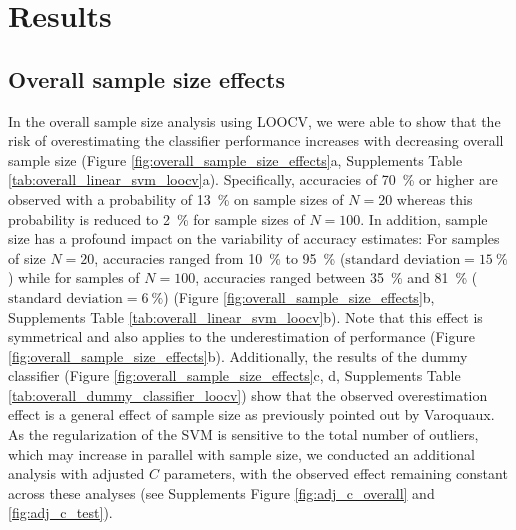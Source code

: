 \documentclass{article}
\begin{document}
    \section{Results}
    \subsection{Overall sample size effects}
    In the overall sample size analysis using LOOCV, we were able to show that the risk of overestimating the classifier performance increases with decreasing overall sample size (Figure \ref{fig:overall_sample_size_effects}a, Supplements Table \ref{tab:overall_linear_svm_loocv}a). Specifically, accuracies of \SI{70}{\percent} or higher are observed with a probability of \SI{13}{\percent} on sample sizes of $N=20$ whereas this probability is reduced to \SI{2}{\percent} for sample sizes of $N=100$. In addition, sample size has a profound impact on the variability of accuracy estimates: For samples of size $N=20$, accuracies ranged from \SI{10}{\percent} to \SI{95}{\percent} ($\text{standard deviation}=\SI{15}{\percent}$) while for samples of $N=100$, accuracies ranged between \SI{35}{\percent} and \SI{81}{\percent} ($\text{standard deviation}=\SI{6}{\percent}$) (Figure \ref{fig:overall_sample_size_effects}b, Supplements Table \ref{tab:overall_linear_svm_loocv}b). Note that this effect is symmetrical and also applies to the underestimation of performance (Figure \ref{fig:overall_sample_size_effects}b). Additionally, the results of the dummy classifier (Figure \ref{fig:overall_sample_size_effects}c, d, Supplements Table \ref{tab:overall_dummy_classifier_loocv}) show that the observed overestimation effect is a general effect of sample size as previously pointed out by Varoquaux\cite{Varoquaux2018}. As the regularization of the SVM is sensitive to the total number of outliers, which may increase in parallel with sample size, we conducted an additional analysis with adjusted $C$ parameters, with the observed effect remaining constant across these analyses (see Supplements Figure \ref{fig:adj_c_overall} and \ref{fig:adj_c_test}).
\end{document}

